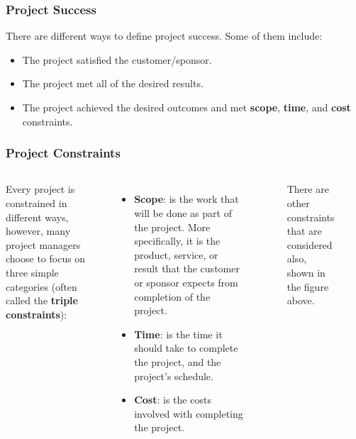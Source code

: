 \documentclass[aspectratio=169]{beamer}
\begin{document}
\begin{frame}
\frametitle{Project Success}
There are different ways to define project success. Some of them include:
\begin{itemize}
\item The project satisfied the customer/sponsor.
\item The project met all of the desired results.
\item The project achieved the desired outcomes and met \textbf{scope}, \textbf{time}, and \textbf{cost} constraints. 
\end{itemize}
\end{frame}

\begin{frame}
\frametitle{Project Constraints}
\begin{columns}
 \small
Every project is constrained in different ways, however, many project managers choose to focus on three simple categories (often called the \textbf{triple constraints}):
\begin{itemize} \small
\item \textbf{Scope}: is the work that will be done as part of the project. More specifically, it is the product, service, or result that the customer or sponsor expects from completion of the project.
\item \textbf{Time}: is the time it should take to complete the project, and the project's schedule.
\item \textbf{Cost}: is the costs involved with completing the project.
\end{itemize}
\begin{figure}
\caption{There are other constraints that are considered also, shown in the figure above.}
\end{figure}
\end{columns}
\end{frame}
\end{document}
